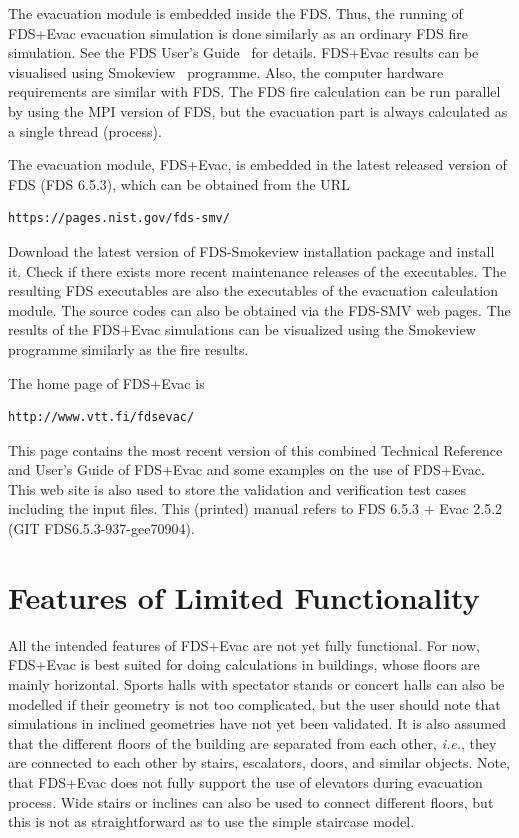 \documentclass[12pt,a4paper,final,twoside]{stylevk}
\begin{document}
\noindent The evacuation module is embedded inside the FDS.  Thus, the
running of FDS+Evac evacuation simulation is done similarly as an
ordinary FDS fire simulation.  See the FDS User's
Guide~\cite{FDS_UserGuide} for details.  FDS+Evac results can be
visualised using Smokeview~\cite{SV_UserGuide,SV_TechGuide,SV_VVGuide}
programme.  Also, the computer hardware requirements are similar with
FDS.  The FDS fire calculation can be run parallel by using the MPI
version of FDS, but the evacuation part is always calculated as a
single thread (process).


The evacuation module, FDS+Evac, is embedded in the latest released
version of FDS (FDS 6.5.3), which can be obtained from the URL
\begin{verbatim}
https://pages.nist.gov/fds-smv/
\end{verbatim}
Download the latest version of FDS-Smokeview installation package and
install it.  Check if there exists more recent maintenance releases of
the executables.  The resulting FDS executables are also the
executables of the evacuation calculation module.  The source codes
can also be obtained via the FDS-SMV web pages.  The results of the
FDS+Evac simulations can be visualized using the Smokeview programme
similarly as the fire results.


The home page of FDS+Evac is 
\begin{verbatim}
http://www.vtt.fi/fdsevac/
\end{verbatim}
This page contains the most recent version of this combined Technical
Reference and User's Guide of FDS+Evac and some examples on the use of
FDS+Evac.  This web site is also used to store the validation and
verification test cases including the input files.  This (printed)
manual refers to FDS 6.5.3 + Evac 2.5.2 (GIT FDS6.5.3-937-gee70904).


\section{Features of Limited Functionality}\label{Sec_SpecFeatures}


\noindent All the intended features of FDS+Evac are not yet fully
functional.  For now, FDS+Evac is best suited for doing calculations
in buildings, whose floors are mainly horizontal.  Sports halls with
spectator stands or concert halls can also be modelled if their
geometry is not too complicated, but the user should note that
simulations in inclined geometries have not yet been validated.  It is
also assumed that the different floors of the building are separated
from each other, \emph{i.e.}, they are connected to each other by
stairs, escalators, doors, and similar objects.  Note, that FDS+Evac
does not fully support the use of elevators during evacuation process.
Wide stairs or inclines can also be used to connect different floors,
but this is not as straightforward as to use the simple staircase
model.
\end{document}
